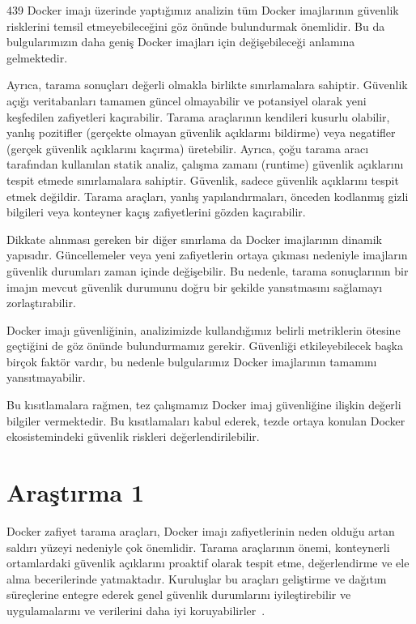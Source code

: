 439 Docker imajı üzerinde yaptığımız analizin tüm Docker imajlarının güvenlik risklerini temsil etmeyebileceğini göz önünde bulundurmak önemlidir. Bu da bulgularımızın daha geniş Docker imajları için değişebileceği anlamına gelmektedir.

Ayrıca, tarama sonuçları değerli olmakla birlikte sınırlamalara sahiptir. Güvenlik açığı veritabanları tamamen güncel olmayabilir ve potansiyel olarak yeni keşfedilen zafiyetleri kaçırabilir. Tarama araçlarının kendileri kusurlu olabilir, yanlış pozitifler (gerçekte olmayan güvenlik açıklarını bildirme) veya negatifler (gerçek güvenlik açıklarını kaçırma) üretebilir. Ayrıca, çoğu tarama aracı tarafından kullanılan statik analiz, çalışma zamanı (runtime) güvenlik açıklarını tespit etmede sınırlamalara sahiptir. Güvenlik, sadece güvenlik açıklarını tespit etmek değildir. Tarama araçları, yanlış yapılandırmaları, önceden kodlanmış gizli bilgileri veya konteyner kaçış zafiyetlerini gözden kaçırabilir.

Dikkate alınması gereken bir diğer sınırlama da Docker imajlarının dinamik yapısıdır. Güncellemeler veya yeni zafiyetlerin ortaya çıkması nedeniyle imajların güvenlik durumları zaman içinde değişebilir. Bu nedenle, tarama sonuçlarının bir imajın mevcut güvenlik durumunu doğru bir şekilde yansıtmasını sağlamayı zorlaştırabilir.

Docker imajı güvenliğinin, analizimizde kullandığımız belirli metriklerin ötesine geçtiğini de göz önünde bulundurmamız gerekir. Güvenliği etkileyebilecek başka birçok faktör vardır, bu nedenle bulgularımız Docker imajlarının tamamını yansıtmayabilir.

Bu kısıtlamalara rağmen, tez çalışmamız Docker imaj güvenliğine ilişkin değerli bilgiler vermektedir. Bu kısıtlamaları kabul ederek, tezde ortaya konulan Docker ekosistemindeki güvenlik riskleri değerlendirilebilir.

\chapter{Araştırma 1}\label{ch:arastirma1}
\vspace{12pt}

Docker zafiyet tarama araçları, Docker imajı zafiyetlerinin neden olduğu artan saldırı yüzeyi nedeniyle çok önemlidir. Tarama araçlarının önemi, konteynerli ortamlardaki güvenlik açıklarını proaktif olarak tespit etme, değerlendirme ve ele alma becerilerinde yatmaktadır. Kuruluşlar bu araçları geliştirme ve dağıtım süreçlerine entegre ederek genel güvenlik durumlarını iyileştirebilir ve uygulamalarını ve verilerini daha iyi koruyabilirler~\autocite{sultan2019}.

